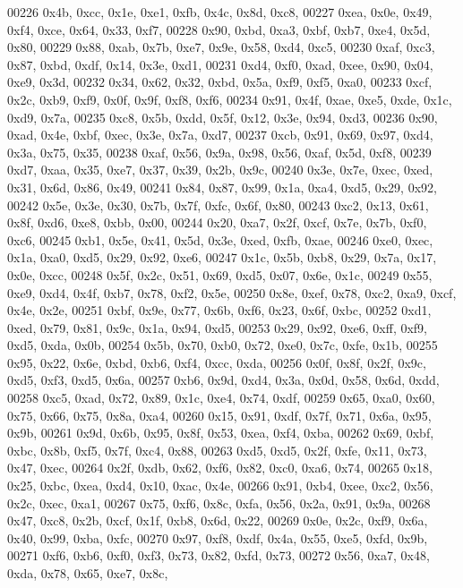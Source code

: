 \begin{DoxyCode}
00226   0x4b, 0xcc, 0x1e, 0xe1, 0xfb, 0x4c, 0x8d, 0xc8,
00227   0xea, 0x0e, 0x49, 0xf4, 0xce, 0x64, 0x33, 0xf7,
00228   0x90, 0xbd, 0xa3, 0xbf, 0xb7, 0xe4, 0x5d, 0x80,
00229   0x88, 0xab, 0x7b, 0xe7, 0x9e, 0x58, 0xd4, 0xc5,
00230   0xaf, 0xc3, 0x87, 0xbd, 0xdf, 0x14, 0x3e, 0xd1,
00231   0xd4, 0xf0, 0xad, 0xee, 0x90, 0x04, 0xe9, 0x3d,
00232   0x34, 0x62, 0x32, 0xbd, 0x5a, 0xf9, 0xf5, 0xa0,
00233   0xcf, 0x2c, 0xb9, 0xf9, 0x0f, 0x9f, 0xf8, 0xf6,
00234   0x91, 0x4f, 0xae, 0xe5, 0xde, 0x1c, 0xd9, 0x7a,
00235   0xc8, 0x5b, 0xdd, 0x5f, 0x12, 0x3e, 0x94, 0xd3,
00236   0x90, 0xad, 0x4e, 0xbf, 0xec, 0x3e, 0x7a, 0xd7,
00237   0xcb, 0x91, 0x69, 0x97, 0xd4, 0x3a, 0x75, 0x35,
00238   0xaf, 0x56, 0x9a, 0x98, 0x56, 0xaf, 0x5d, 0xf8,
00239   0xd7, 0xaa, 0x35, 0xe7, 0x37, 0x39, 0x2b, 0x9c,
00240   0x3e, 0x7e, 0xec, 0xed, 0x31, 0x6d, 0x86, 0x49,
00241   0x84, 0x87, 0x99, 0x1a, 0xa4, 0xd5, 0x29, 0x92,
00242   0x5e, 0x3e, 0x30, 0x7b, 0x7f, 0xfc, 0x6f, 0x80,
00243   0xc2, 0x13, 0x61, 0x8f, 0xd6, 0xe8, 0xbb, 0x00,
00244   0x20, 0xa7, 0x2f, 0xcf, 0x7e, 0x7b, 0xf0, 0xc6,
00245   0xb1, 0x5e, 0x41, 0x5d, 0x3e, 0xed, 0xfb, 0xae,
00246   0xe0, 0xec, 0x1a, 0xa0, 0xd5, 0x29, 0x92, 0xe6,
00247   0x1c, 0x5b, 0xb8, 0x29, 0x7a, 0x17, 0x0e, 0xcc,
00248   0x5f, 0x2c, 0x51, 0x69, 0xd5, 0x07, 0x6e, 0x1c,
00249   0x55, 0xe9, 0xd4, 0x4f, 0xb7, 0x78, 0xf2, 0x5e,
00250   0x8e, 0xef, 0x78, 0xc2, 0xa9, 0xcf, 0x4e, 0x2e,
00251   0xbf, 0x9e, 0x77, 0x6b, 0xf6, 0x23, 0x6f, 0xbc,
00252   0xd1, 0xed, 0x79, 0x81, 0x9c, 0x1a, 0x94, 0xd5,
00253   0x29, 0x92, 0xe6, 0xff, 0xf9, 0xd5, 0xda, 0x0b,
00254   0x5b, 0x70, 0xb0, 0x72, 0xe0, 0x7c, 0xfe, 0x1b,
00255   0x95, 0x22, 0x6e, 0xbd, 0xb6, 0xf4, 0xcc, 0xda,
00256   0x0f, 0x8f, 0x2f, 0x9c, 0xd5, 0xf3, 0xd5, 0x6a,
00257   0xb6, 0x9d, 0xd4, 0x3a, 0x0d, 0x58, 0x6d, 0xdd,
00258   0xc5, 0xad, 0x72, 0x89, 0x1c, 0xe4, 0x74, 0xdf,
00259   0x65, 0xa0, 0x60, 0x75, 0x66, 0x75, 0x8a, 0xa4,
00260   0x15, 0x91, 0xdf, 0x7f, 0x71, 0x6a, 0x95, 0x9b,
00261   0x9d, 0x6b, 0x95, 0x8f, 0x53, 0xea, 0xf4, 0xba,
00262   0x69, 0xbf, 0xbc, 0x8b, 0xf5, 0x7f, 0xc4, 0x88,
00263   0xd5, 0xd5, 0x2f, 0xfe, 0x11, 0x73, 0x47, 0xec,
00264   0x2f, 0xdb, 0x62, 0xf6, 0x82, 0xc0, 0xa6, 0x74,
00265   0x18, 0x25, 0xbc, 0xea, 0xd4, 0x10, 0xac, 0x4e,
00266   0x91, 0xb4, 0xee, 0xc2, 0x56, 0x2c, 0xec, 0xa1,
00267   0x75, 0xf6, 0x8c, 0xfa, 0x56, 0x2a, 0x91, 0x9a,
00268   0x47, 0xc8, 0x2b, 0xcf, 0x1f, 0xb8, 0x6d, 0x22,
00269   0x0e, 0x2c, 0xf9, 0x6a, 0x40, 0x99, 0xba, 0xfc,
00270   0x97, 0xf8, 0xdf, 0x4a, 0x55, 0xe5, 0xfd, 0x9b,
00271   0xf6, 0xb6, 0xf0, 0xf3, 0x73, 0x82, 0xfd, 0x73,
00272   0x56, 0xa7, 0x48, 0xda, 0x78, 0x65, 0xe7, 0x8c,

\end{DoxyCode}

